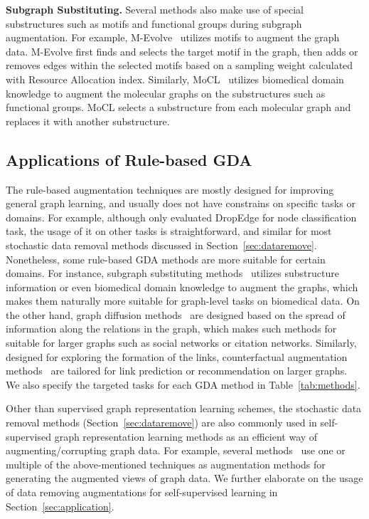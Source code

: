 \documentclass[11pt]{article}
\renewcommand\paragraph[1]{\vspace{0.05in} \noindent \textbf{#1.}}
\begin{document}
\paragraph{Subgraph Substituting}
Several methods also make use of special substructures such as motifs and functional groups during subgraph augmentation. For example,
M-Evolve~\cite{zhou2020data} utilizes motifs to augment the graph data. M-Evolve first finds and selects the target motif in the graph, then adds or removes edges within the selected motifs based on a sampling weight calculated with Resource Allocation index.
Similarly, MoCL~\cite{sun2021mocl} utilizes biomedical domain knowledge to augment the molecular graphs on the substructures such as functional groups. 
MoCL selects a substructure from each molecular graph and replaces it with another substructure. 


\subsection{Applications of Rule-based GDA}
The rule-based augmentation techniques are mostly designed for improving general graph learning, and usually does not have constrains on specific tasks or domains. For example, although \citet{rong2019dropedge} only evaluated DropEdge for node classification task, the usage of it on other tasks is straightforward, and similar for most stochastic data removal methods discussed in Section~\ref{sec:dataremove}. Nonetheless, some rule-based GDA methods are more suitable for certain domains. For instance, subgraph substituting methods~\cite{zhou2020data,sun2021mocl} utilizes substructure information or even biomedical domain knowledge to augment the graphs, which makes them naturally more suitable for graph-level tasks on biomedical data. On the other hand, graph diffusion methods~\cite{klicpera2019diffusion} are designed based on the spread of information along the relations in the graph, which makes such methods for suitable for larger graphs such as social networks or citation networks. Similarly, designed for exploring the formation of the links, counterfactual augmentation methods~\cite{zhao2021counterfactual,zhu2022data} are tailored for link prediction or recommendation on larger graphs. We also specify the targeted tasks for each GDA method in Table~\ref{tab:methods}.

Other than supervised graph representation learning schemes, the stochastic data removal methods (Section~\ref{sec:dataremove}) are also commonly used in self-supervised graph representation learning methods as an efficient way of augmenting/corrupting graph data. For example, several methods~\cite{velickovic2019deep,you2020graph,you2021graph,thakoor2022largescale} use one or multiple of the above-mentioned techniques as augmentation methods for generating the augmented views of graph data. We further elaborate on the usage of data removing augmentations for self-supervised learning in Section~\ref{sec:application}.
\end{document}
